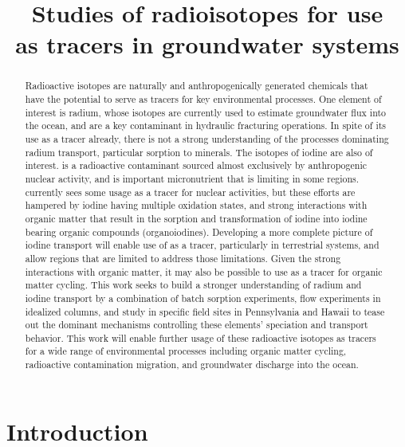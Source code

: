 \documentclass[twoside,12pt,titlepage]{article}
\title{Studies of radioisotopes for use \\as tracers in groundwater systems}
\author{\machen}
\newcommand{\isotope}[2]{\ch{^{#1}#2}}
\begin{document}
\maketitle
\thispagestyle{plain}

\begin{abstract}
Radioactive isotopes are naturally and anthropogenically generated chemicals that have the potential to serve as tracers for key environmental processes. One element of interest is radium, whose isotopes are currently used to estimate groundwater flux into the ocean, and are a key contaminant in hydraulic fracturing operations. In spite of its use as a tracer already, there is not a strong understanding of the processes dominating radium transport, particular sorption to minerals. The isotopes of iodine are also of interest. \isotope{129}{I} is a radioactive contaminant sourced almost exclusively by anthropogenic nuclear activity, and \isotope{127}{I} is important micronutrient that is limiting in some regions. \isotope{129}{I} currently sees some usage as a tracer for nuclear activities, but these efforts are hampered by iodine having multiple oxidation states, and strong interactions with organic matter that result in the sorption and transformation of iodine into iodine bearing organic compounds (organoiodines). Developing a more complete picture of iodine transport will enable use of \isotope{129}{I} as a tracer, particularly in terrestrial systems, and allow regions that are \isotope{127}{I} limited to address those limitations. Given the strong interactions with organic matter, it may also be possible to use \isotope{129}{I} as a tracer for organic matter cycling. This work seeks to build a stronger understanding of radium and iodine transport by a combination of batch sorption experiments, flow experiments in idealized columns, and study in specific field sites in Pennsylvania and Hawaii to tease out the dominant mechanisms controlling these elements' speciation and transport behavior. This work will enable further usage of these radioactive isotopes as tracers for a wide range of environmental processes including organic matter cycling, radioactive contamination migration, and groundwater discharge into the ocean.
\end{abstract}

\section{Introduction}
\end{document}
